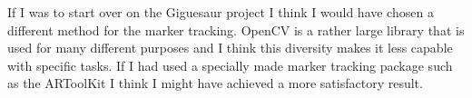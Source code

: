 \documentclass{article}
\begin{document}
If I was to start over on the Giguesaur project I think I would have chosen a different method for the marker tracking. OpenCV is a rather large library that is used for many different purposes and I think this diversity makes it less capable with specific tasks. If I had used a specially made marker tracking package such as the ARToolKit I think I might have achieved a more satisfactory result. 




\nocite{*}


\end{document}
